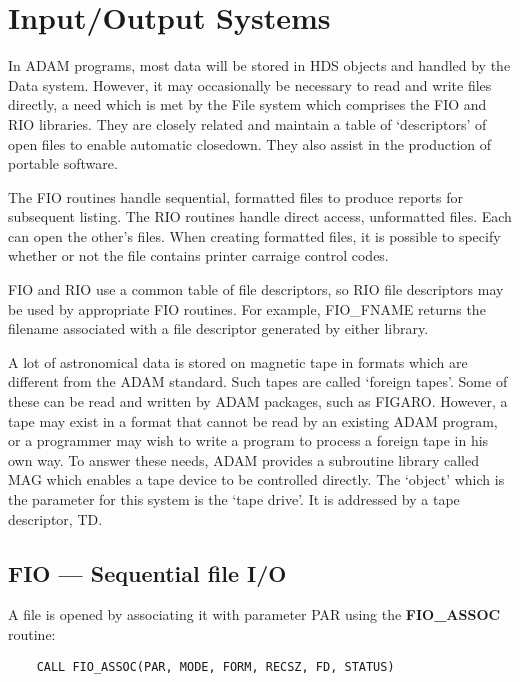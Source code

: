 \chapter{Input/Output Systems}
\label{C_iosys}

In ADAM programs, most data will be stored in HDS objects and handled by the
Data system.
However, it may occasionally be necessary  to read and write files directly, a
need which is met by the File system which comprises the FIO and RIO libraries.
They are closely related and maintain a table of `descriptors' of open files to
enable automatic closedown.
They also assist in the production of portable software.

The FIO routines handle sequential, formatted files to produce reports for
subsequent listing.
The RIO routines handle direct access, unformatted files.
Each can open the other's files.
When creating formatted files, it is possible to specify whether or not the file
contains printer carraige control codes.

FIO and RIO use a common table of file descriptors, so RIO file descriptors
may be used by appropriate FIO routines.
For example, FIO\_FNAME returns the filename associated with a file descriptor
generated by either library.

A lot of astronomical data is stored on magnetic tape in formats which are
different from the ADAM standard.
Such tapes are called `foreign tapes'.
Some of these can be read and written by ADAM packages, such as FIGARO.
However, a tape may exist in a format that cannot be read by an existing
ADAM program, or a programmer may wish to write a program to process a foreign
tape in his own way.
To answer these needs, ADAM provides a subroutine library called MAG which
enables a tape device to be controlled directly.
The `object' which is the parameter for this system is the `tape drive'.
It is addressed by a tape descriptor, TD.

\section{FIO --- Sequential file I/O}
\label{S_fio}

A file is opened by associating it with parameter
PAR using the {\bf FIO\_ASSOC}
routine:

\begin{small}
\begin{verbatim}
    CALL FIO_ASSOC(PAR, MODE, FORM, RECSZ, FD, STATUS)
\end{verbatim}
\end{small}

